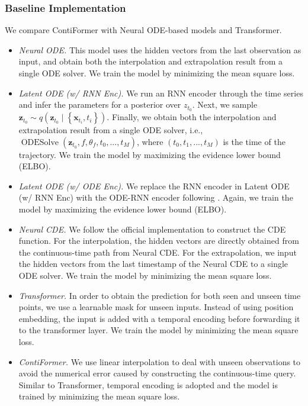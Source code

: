 \subsubsection{Baseline Implementation}

We compare ContiFormer with Neural ODE-based models and Transformer. 

\begin{itemize}[leftmargin=5mm]
    \item \textit{Neural ODE\cite{chen2018neural}.} This model uses the hidden vectors from the last observation as input, and obtain both the interpolation and extrapolation result from a single ODE solver. We train the model by minimizing the mean square loss.
    \item \textit{Latent ODE (w/ RNN Enc)\cite{chen2018neural}.} We run an RNN encoder through the time series and infer the parameters for a posterior over $z_{t_0}$. Next, we sample $\mathbf{z}_{t_0} \sim q\left(\mathbf{z}_{t_0} \mid\left\{\mathbf{x}_{t_i}, t_i\right\}\right)$. Finally, we obtain both the interpolation and extrapolation result from a single ODE solver, i.e., $\operatorname{ODESolve}(\mathbf{z}_{t_0}, f, \theta_f , t_0, . . . , t_M)$, where $(t_0, t_1, ..., t_M)$ is the time of the trajectory. We train the model by maximizing the evidence lower bound (ELBO). 
    \item \textit{Latent ODE (w/ ODE Enc)\cite{rubanova2019latent}.} We replace the RNN encoder in Latent ODE (w/ RNN Enc) with the ODE-RNN encoder following \cite{rubanova2019latent}. Again, we train the model by maximizing the evidence lower bound (ELBO).
    \item \textit{Neural CDE\cite{park2022neural}.} We follow the official implementation to construct the CDE function. For the interpolation, the hidden vectors are directly obtained from the continuous-time path from Neural CDE. For the extrapolation, we input the hidden vectors from the last timestamp of the Neural CDE to a single ODE solver. We train the model by minimizing the mean square loss.
    \item \textit{Transformer\cite{vaswani2017attention}.} In order to obtain the prediction for both seen and unseen time points, we use a learnable mask for unseen inputs. Instead of using position embedding, the input is added with a temporal encoding before forwarding it to the transformer layer. We train the model by minimizing the mean square loss.
    \item \textit{ContiFormer.} We use linear interpolation to deal with unseen observations to avoid the numerical error caused by constructing the continuous-time query. Similar to Transformer, temporal encoding is adopted and the model is trained by minimizing the mean square loss.
\end{itemize}

